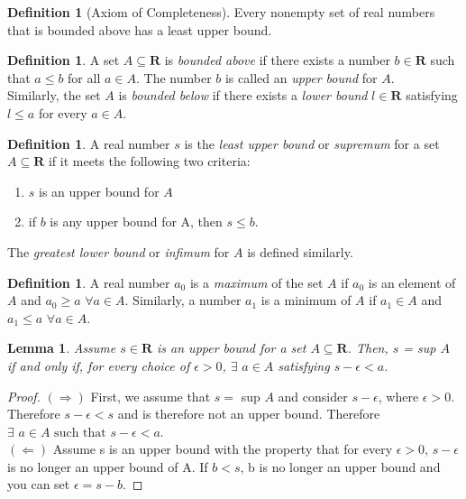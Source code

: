 \documentclass[12pt,letterpaper]{report}
\newtheorem{lemma}[theorem]{Lemma}
\theoremstyle{definition}
\newtheorem{definition}[theorem]{Definition}
\theoremstyle{remark}
\newcommand{\R}{\mathbf{R}}
\begin{document}
\begin{definition} [Axiom of Completeness]
Every nonempty set of real numbers that is bounded above has a least upper bound.
\end{definition}

\begin{definition}
    A set $A \subseteq \R$ is \textit{bounded above} if there exists a number $b \in \R$ such that $a \leq b$ for all $a \in A$. The number $b$ is called an \textit{upper bound} for $A$.\\ Similarly, the set $A$ is \textit{bounded below} if there exists a \textit{lower bound} $l \in \R$ satisfying $l \leq a$ for every $a \in A$. 
\end{definition}

\begin{definition}
    A real number $s$ is the \textit{least upper bound} or \textit{supremum} for a set $A \subseteq \R$ if it meets the following two criteria: 
    \begin{enumerate}
        \item[(i)] $s$ is an upper bound for $A$
        \item[(ii)] if $b$ is any upper bound for A, then $s \leq b$.
    \end{enumerate}
\end{definition}

\begin{flushleft}
    The \textit{greatest lower bound} or \textit{infimum} for $A$ is defined similarly.
\end{flushleft}

\begin{definition}
    A real number $a_0$ is a \textit{maximum} of the set $A$ if $a_0$ is an element of $A$ and $a_0 \geq a \hspace{4pt} \forall a \in A$. Similarly, a number $a_1$ is a minimum of $A$ if $a_1 \in A$ and $a_1 \leq a \hspace{4pt} \forall a \in A$.
\end{definition}

\begin{lemma}
    Assume $s \in \R$ is an upper bound for a set $A \subseteq \R$. Then, $s$ = sup $A$ if and only if, for every choice of $\epsilon > 0$, $\exists \hspace{4pt} a \in A$ satisfying $s-\epsilon < a$.
\end{lemma}

\begin{proof}
    $(\Rightarrow)$ First, we assume that $s=$ sup $A$ and consider $s-\epsilon$, where $\epsilon > 0$. Therefore $s-\epsilon < s$ and is therefore not an upper bound. Therefore $\exists \hspace{4pt} a \in A \text{ such that }s-\epsilon < a$. \\
    $(\Leftarrow)$ Assume s is an upper bound with the property that for every $\epsilon > 0$, $s-\epsilon$ is no longer an upper bound of A. If $b < s$, b is no longer an upper bound and you can set $\epsilon = s-b$. 
\end{proof}
\end{document}

